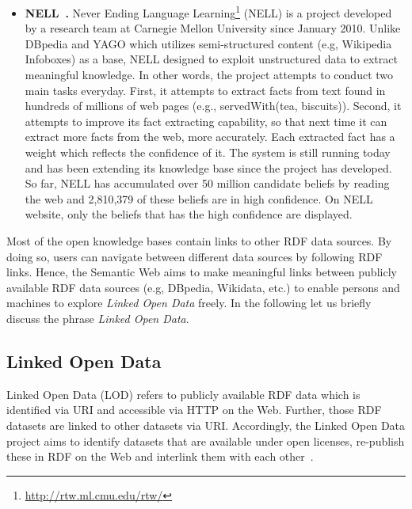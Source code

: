 \begin{itemize}
\item \textbf{NELL~\cite{DBLP:conf/wsdm/CarlsonBWHM10}.} Never Ending Language Learning\footnote{\url{http://rtw.ml.cmu.edu/rtw/}} (NELL) is a project developed by a research team at Carnegie Mellon University since January 2010. Unlike DBpedia and YAGO which utilizes semi-structured content (e.g, Wikipedia Infoboxes)  as a base, NELL designed to exploit unstructured data to extract meaningful knowledge. In other words, the project attempts to conduct two main tasks everyday.
First, it attempts to extract facts from text found in hundreds of millions of web pages (e.g., servedWith(tea, biscuits)).
Second, it attempts to improve its fact extracting capability, so that next time it can extract more facts from the web, more accurately. Each extracted fact has a weight which reflects the confidence of it. The system is still running today and has been extending its knowledge base since the project has developed. So far, NELL has accumulated over 50 million candidate beliefs by reading the web and 2,810,379 of these beliefs are in high confidence. On NELL website, only the beliefs that has the high confidence are displayed. 
\end{itemize}\vspace{0.5cm}
\noindent Most of the open knowledge bases contain links to other RDF data sources. By doing so, users can navigate between
different data sources by following RDF links. Hence, the Semantic Web aims to make meaningful links between publicly available RDF data sources (e.g, DBpedia, Wikidata, etc.) to enable persons and machines to explore \textit{Linked Open Data} freely. In the following let us  briefly discuss the phrase \textit{Linked Open Data}.\\

\subsection{Linked Open Data}
Linked Open Data (LOD) refers to publicly available RDF data which is identified via URI and accessible via HTTP on the Web. Further, those RDF datasets are linked to other datasets via URI. Accordingly, the Linked Open Data project aims to identify datasets that are available under open licenses, re-publish
these in RDF on the Web and interlink them with each other~\cite{DBLP:conf/www/BizerHIB08}. \\


